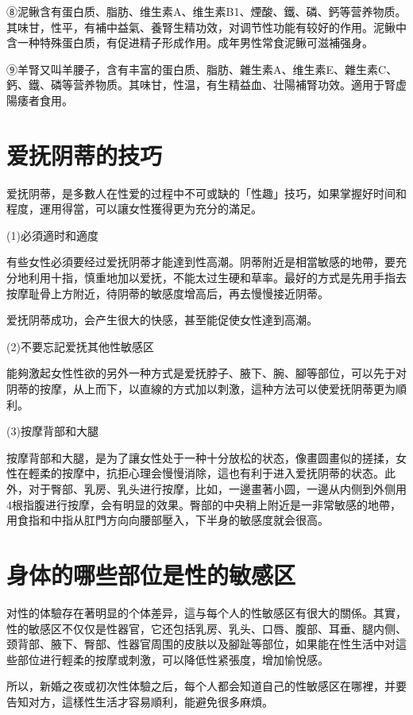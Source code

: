 \documentclass[12pt,UTF8]{ctexbook}
\begin{document}
⑧泥鳅含有蛋白质、脂肪、维生素A、维生素B1、煙酸、鐵、磷、鈣等营养物质。其味甘，性平，有補中益氣、養腎生精功效，对调节性功能有较好的作用。泥鳅中含一种特殊蛋白质，有促进精子形成作用。成年男性常食泥鳅可滋補强身。

⑨羊腎又叫羊腰子，含有丰富的蛋白质、脂肪、雜生素A、维生素E、雜生素C、鈣、鐵、磷等营养物质。其味甘，性温，有生精益血、壮陽補腎功效。適用于腎虚陽痿者食用。

\section{爱抚阴蒂的技巧}

爱抚阴蒂，是多數人在性爱的过程中不可或缺的「性趣」技巧，如果掌握好时间和程度，運用得當，可以讓女性獲得更为充分的滿足。

(1)必須適时和適度

有些女性必須要经过爱抚阴蒂才能達到性高潮。阴蒂附近是相當敏感的地帶，要充分地利用十指，慎重地加以爱抚，不能太过生硬和草率。最好的方式是先用手指去按摩耻骨上方附近，待阴蒂的敏感度增高后，再去慢慢接近阴蒂。

爱抚阴蒂成功，会产生很大的快感，甚至能促使女性達到高潮。

(2)不要忘記爱抚其他性敏感区

能夠激起女性性欲的另外一种方式是爱抚脖子、腋下、腕、腳等部位，可以先于对阴蒂的按摩，从上而下，以直線的方式加以刺激，這种方法可以使爱抚阴蒂更为順利。

(3)按摩背部和大腿

按摩背部和大腿，是为了讓女性处于一种十分放松的状态，像畫圆畫似的搓揉，女性在輕柔的按摩中，抗拒心理会慢慢消除，這也有利于进入爱抚阴蒂的状态。此外，对于臀部、乳房、乳头进行按摩，比如，一邊畫著小圆，一邊从内侧到外侧用4根指腹进行按摩，会有明显的效果。臀部的中央稍上附近是一非常敏感的地帶，用食指和中指从肛門方向向腰部壓入，下半身的敏感度就会很高。

\section{身体的哪些部位是性的敏感区}

对性的体驗存在著明显的个体差异，這与每个人的性敏感区有很大的關係。其實，性的敏感区不仅仅是性器官，它还包括乳房、乳头、口唇、腹部、耳垂、腿内侧、颈背部、腋下、臀部、性器官周围的皮肤以及腳趾等部位，如果能在性生活中对這些部位进行輕柔的按摩或刺激，可以降低性紧張度，增加愉悅感。

所以，新婚之夜或初次性体驗之后，每个人都会知道自己的性敏感区在哪裡，并要告知对方，這樣性生活才容易順利，能避免很多麻煩。
\end{document}
